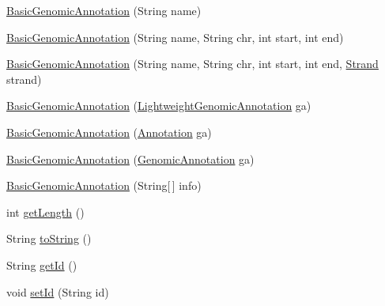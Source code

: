 \begin{DoxyCompactItemize}
\item 
\hyperlink{classbroad_1_1core_1_1annotation_1_1_basic_genomic_annotation_a3114c577c98be5247cab5af7e4d18de8}{Basic\+Genomic\+Annotation} (String name)
\item 
\hyperlink{classbroad_1_1core_1_1annotation_1_1_basic_genomic_annotation_aa9382daaead1a022b789912657210c04}{Basic\+Genomic\+Annotation} (String name, String chr, int start, int end)
\item 
\hyperlink{classbroad_1_1core_1_1annotation_1_1_basic_genomic_annotation_a4300adf1e558e71df076b03fbf460b01}{Basic\+Genomic\+Annotation} (String name, String chr, int start, int end, \hyperlink{enumumms_1_1core_1_1annotation_1_1_annotation_1_1_strand}{Strand} strand)
\item 
\hyperlink{classbroad_1_1core_1_1annotation_1_1_basic_genomic_annotation_a0874de9517ae4cc06c4ef52a912c2f4d}{Basic\+Genomic\+Annotation} (\hyperlink{interfacebroad_1_1core_1_1annotation_1_1_lightweight_genomic_annotation}{Lightweight\+Genomic\+Annotation} ga)
\item 
\hyperlink{classbroad_1_1core_1_1annotation_1_1_basic_genomic_annotation_a4c90a35ddd1de784ba8049ef817c2a7b}{Basic\+Genomic\+Annotation} (\hyperlink{interfaceumms_1_1core_1_1annotation_1_1_annotation}{Annotation} ga)
\item 
\hyperlink{classbroad_1_1core_1_1annotation_1_1_basic_genomic_annotation_a1f075ab11027b66c3f9465d8dc39f080}{Basic\+Genomic\+Annotation} (\hyperlink{interfacebroad_1_1core_1_1annotation_1_1_genomic_annotation}{Genomic\+Annotation} ga)
\item 
\hyperlink{classbroad_1_1core_1_1annotation_1_1_basic_genomic_annotation_aa1bb7dc02c29f06ed7ab80738d7f643e}{Basic\+Genomic\+Annotation} (String\mbox{[}$\,$\mbox{]} info)
\item 
int \hyperlink{classbroad_1_1core_1_1annotation_1_1_basic_genomic_annotation_a1572a98b3c0a66370168e7f0eaa524df}{get\+Length} ()
\item 
String \hyperlink{classbroad_1_1core_1_1annotation_1_1_basic_genomic_annotation_a56e9868db1deb9f569cd17ab979f48cc}{to\+String} ()
\item 
String \hyperlink{classbroad_1_1core_1_1annotation_1_1_basic_genomic_annotation_a38f97fda9ac408d296525789104eb96c}{get\+Id} ()
\item 
void \hyperlink{classbroad_1_1core_1_1annotation_1_1_basic_genomic_annotation_aab81f801d84164ee7db06ce74d45ea50}{set\+Id} (String id)
\item 

\end{DoxyCompactItemize}
